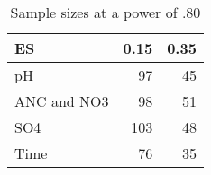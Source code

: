 \begin{table}[htbp]
\centering
\caption{Sample sizes at a power of .80}
\begin{tabular}{lrr}
\toprule

 ES & 0.15 & 0.35 \\ 
 \midrule
pH & 97 & 45 \\ 
ANC and NO3 & 98 & 51 \\ 
SO4 & 103 & 48 \\ 
Time & 76 & 35 \\ 
\bottomrule
\end{tabular}
\label{powergraphtable}
\end{table}
